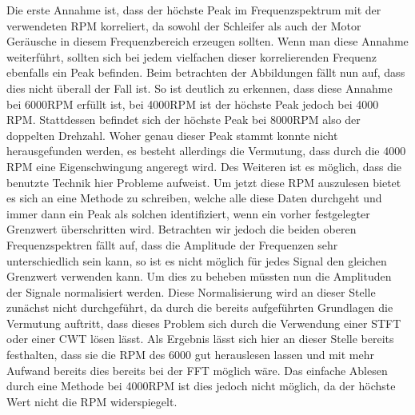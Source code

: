 Die erste Annahme ist, dass der höchste Peak im Frequenzspektrum mit der verwendeten RPM korreliert, da sowohl der Schleifer als auch der Motor Geräusche in diesem Frequenzbereich erzeugen sollten. Wenn man diese Annahme weiterführt, sollten sich bei jedem vielfachen dieser korrelierenden Frequenz ebenfalls ein Peak befinden. Beim betrachten der Abbildungen fällt nun auf, dass dies nicht überall der Fall ist. So ist deutlich zu erkennen, dass diese Annahme bei 6000RPM erfüllt ist, bei 4000RPM ist der höchste Peak jedoch bei 4000 RPM. Stattdessen befindet sich der höchste Peak bei 8000RPM also der doppelten Drehzahl. Woher genau dieser Peak stammt konnte nicht herausgefunden werden, es besteht allerdings die Vermutung, dass durch die 4000 RPM eine Eigenschwingung angeregt wird. Des Weiteren ist es möglich, dass die benutzte Technik hier Probleme aufweist. Um jetzt diese RPM auszulesen bietet es sich an eine Methode zu schreiben, welche alle diese Daten durchgeht und immer dann ein Peak als solchen identifiziert, wenn ein vorher festgelegter Grenzwert überschritten wird. Betrachten wir jedoch die beiden oberen Frequenzspektren fällt auf, dass die Amplitude der Frequenzen sehr unterschiedlich sein kann, so ist es nicht möglich  für jedes Signal den gleichen Grenzwert verwenden kann. Um dies zu beheben müssten nun die Amplituden der Signale normalisiert werden. Diese Normalisierung wird an dieser Stelle zunächst nicht durchgeführt, da durch die bereits aufgeführten Grundlagen die Vermutung auftritt, dass dieses Problem sich durch die Verwendung einer \ac{STFT} oder einer \ac{CWT} lösen lässt. Als Ergebnis lässt sich hier an dieser Stelle bereits festhalten, dass sie die RPM des 6000 gut herauslesen lassen und mit mehr Aufwand bereits dies bereits bei der \ac{FFT} möglich wäre. Das einfache Ablesen durch eine Methode bei 4000RPM ist dies jedoch nicht möglich, da der höchste Wert nicht die RPM widerspiegelt.

